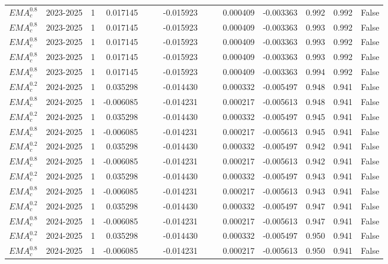 \begin{tabular}{@{}llrrrrrrrrrlll@{}}
$EMA^{0.8}_{c}$ & 2023-2025 & 1 & 0.017145 &  &  & -0.015923 &  &  & 0.000409 & -0.003363 & 0.992 & 0.992 & False \\
$EMA^{0.8}_{c}$ & 2023-2025 & 1 & 0.017145 &  &  & -0.015923 &  &  & 0.000409 & -0.003363 & 0.993 & 0.992 & False \\
$EMA^{0.8}_{c}$ & 2023-2025 & 1 & 0.017145 &  &  & -0.015923 &  &  & 0.000409 & -0.003363 & 0.993 & 0.992 & False \\
$EMA^{0.8}_{c}$ & 2023-2025 & 1 & 0.017145 &  &  & -0.015923 &  &  & 0.000409 & -0.003363 & 0.993 & 0.992 & False \\
$EMA^{0.8}_{c}$ & 2023-2025 & 1 & 0.017145 &  &  & -0.015923 &  &  & 0.000409 & -0.003363 & 0.994 & 0.992 & False \\
$EMA^{0.2}_{c}$ & 2024-2025 & 1 & 0.035298 &  &  & -0.014430 &  &  & 0.000332 & -0.005497 & 0.948 & 0.941 & False \\
$EMA^{0.8}_{c}$ & 2024-2025 & 1 & -0.006085 &  &  & -0.014231 &  &  & 0.000217 & -0.005613 & 0.948 & 0.941 & False \\
$EMA^{0.2}_{c}$ & 2024-2025 & 1 & 0.035298 &  &  & -0.014430 &  &  & 0.000332 & -0.005497 & 0.945 & 0.941 & False \\
$EMA^{0.8}_{c}$ & 2024-2025 & 1 & -0.006085 &  &  & -0.014231 &  &  & 0.000217 & -0.005613 & 0.945 & 0.941 & False \\
$EMA^{0.2}_{c}$ & 2024-2025 & 1 & 0.035298 &  &  & -0.014430 &  &  & 0.000332 & -0.005497 & 0.942 & 0.941 & False \\
$EMA^{0.8}_{c}$ & 2024-2025 & 1 & -0.006085 &  &  & -0.014231 &  &  & 0.000217 & -0.005613 & 0.942 & 0.941 & False \\
$EMA^{0.2}_{c}$ & 2024-2025 & 1 & 0.035298 &  &  & -0.014430 &  &  & 0.000332 & -0.005497 & 0.943 & 0.941 & False \\
$EMA^{0.8}_{c}$ & 2024-2025 & 1 & -0.006085 &  &  & -0.014231 &  &  & 0.000217 & -0.005613 & 0.943 & 0.941 & False \\
$EMA^{0.2}_{c}$ & 2024-2025 & 1 & 0.035298 &  &  & -0.014430 &  &  & 0.000332 & -0.005497 & 0.947 & 0.941 & False \\
$EMA^{0.8}_{c}$ & 2024-2025 & 1 & -0.006085 &  &  & -0.014231 &  &  & 0.000217 & -0.005613 & 0.947 & 0.941 & False \\
$EMA^{0.2}_{c}$ & 2024-2025 & 1 & 0.035298 &  &  & -0.014430 &  &  & 0.000332 & -0.005497 & 0.950 & 0.941 & False \\
$EMA^{0.8}_{c}$ & 2024-2025 & 1 & -0.006085 &  &  & -0.014231 &  &  & 0.000217 & -0.005613 & 0.950 & 0.941 & False \\

\end{tabular}
